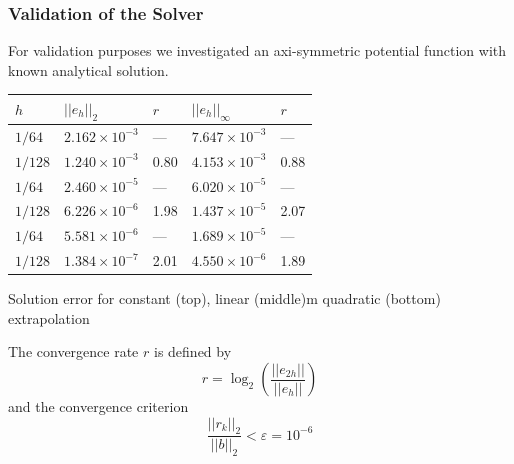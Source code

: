 \documentclass[xcolor=pdftex,table,10pt]{beamer}
\begin{document}
     	\begin{frame}
		\frametitle{Validation of the Solver}

		For validation purposes we investigated an axi-symmetric potential function with known analytical solution. 

    	\begin{center}
        \begin{tabular}{lllll}
              \hline
              $h$ & $\vert\vert e_h \vert\vert_2$ & $r$ & $\vert\vert e_h
              \vert\vert_\infty$ & $r$ \\ [0.2ex] \hline \hline
              $1/64$  & $2.162 \times 10^{-3}$ & --- & $7.647 \times 10^{-3}$ & --- \\ 
              $1/128$ & $1.240 \times 10^{-3}$ & 0.80 & $4.153 \times 10^{-3}$ & 0.88 \\ 
              \hline
              \hline
              $1/64$  & $2.460 \times 10^{-5}$ & --- & $6.020 \times 10^{-5}$ & --- \\
              $1/128$ & $6.226 \times 10^{-6}$ & 1.98 & $1.437 \times 10^{-5}$ & 2.07 \\
              \hline
              \hline
              $1/64$  & $5.581 \times 10^{-6}$ & --- & $1.689 \times 10^{-5}$ & --- \\ 
              $1/128$ & $1.384 \times 10^{-7}$ & 2.01 & $4.550 \times 10^{-6}$ & 1.89  \\ 
            \hline
        \end{tabular}

        \vspace{0.2cm}
        \tiny{Solution error for constant (top), linear (middle)m quadratic (bottom) extrapolation}
        \end{center}

        \vspace{0.1cm}

        The convergence rate $r$ is defined by
        \[
            r = \log_2 \left( \frac{\vert\vert e_{2h} \vert\vert}{\vert\vert e_h \vert\vert} \right)
        \]
        and the convergence criterion
        \[
            \frac{\vert\vert r_k \vert\vert_2}{\vert\vert b \vert\vert_2} < \varepsilon = 10^{-6}
        \]

	\end{frame}
    
\end{document}
